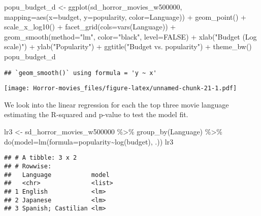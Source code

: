 \documentclass[
]{article}
\newenvironment{Shaded}{\begin{snugshade}}{\end{snugshade}}
\newcommand{\AttributeTok}[1]{\textcolor[rgb]{0.77,0.63,0.00}{#1}}
\newcommand{\ConstantTok}[1]{\textcolor[rgb]{0.00,0.00,0.00}{#1}}
\newcommand{\FunctionTok}[1]{\textcolor[rgb]{0.00,0.00,0.00}{#1}}
\newcommand{\NormalTok}[1]{#1}
\newcommand{\OtherTok}[1]{\textcolor[rgb]{0.56,0.35,0.01}{#1}}
\newcommand{\SpecialCharTok}[1]{\textcolor[rgb]{0.00,0.00,0.00}{#1}}
\newcommand{\StringTok}[1]{\textcolor[rgb]{0.31,0.60,0.02}{#1}}
\begin{document}
\begin{Shaded}
\begin{Highlighting}[]
\NormalTok{popu\_budget\_d }\OtherTok{\textless{}{-}} \FunctionTok{ggplot}\NormalTok{(sd\_horror\_movies\_w500000, }\AttributeTok{mapping=}\FunctionTok{aes}\NormalTok{(}\AttributeTok{x=}\NormalTok{budget, }\AttributeTok{y=}\NormalTok{popularity, }\AttributeTok{color=}\NormalTok{Language)) }\SpecialCharTok{+} \FunctionTok{geom\_point}\NormalTok{() }\SpecialCharTok{+} \FunctionTok{scale\_x\_log10}\NormalTok{() }\SpecialCharTok{+} \FunctionTok{facet\_grid}\NormalTok{(}\AttributeTok{cols=}\FunctionTok{vars}\NormalTok{(Language)) }\SpecialCharTok{+} \FunctionTok{geom\_smooth}\NormalTok{(}\AttributeTok{method=}\StringTok{"lm"}\NormalTok{, }\AttributeTok{color=}\StringTok{"black"}\NormalTok{, }\AttributeTok{level=}\ConstantTok{FALSE}\NormalTok{) }\SpecialCharTok{+} \FunctionTok{xlab}\NormalTok{(}\StringTok{"Budget (Log scale)"}\NormalTok{) }\SpecialCharTok{+} \FunctionTok{ylab}\NormalTok{(}\StringTok{"Popularity"}\NormalTok{) }\SpecialCharTok{+} \FunctionTok{ggtitle}\NormalTok{(}\StringTok{"Budget vs. popularity"}\NormalTok{) }\SpecialCharTok{+} \FunctionTok{theme\_bw}\NormalTok{()}
\NormalTok{popu\_budget\_d}
\end{Highlighting}
\end{Shaded}

\begin{verbatim}
## `geom_smooth()` using formula = 'y ~ x'
\end{verbatim}

\texttt{[image: Horror-movies\_files/figure-latex/unnamed-chunk-21-1.pdf]}

We look into the linear regression for each the top three movie language
estimating the R-squared and p-value to test the model fit.

\begin{Shaded}
\begin{Highlighting}[]
\NormalTok{lr3 }\OtherTok{\textless{}{-}}\NormalTok{ sd\_horror\_movies\_w500000 }\SpecialCharTok{\%\textgreater{}\%} \FunctionTok{group\_by}\NormalTok{(Language) }\SpecialCharTok{\%\textgreater{}\%} \FunctionTok{do}\NormalTok{(}\AttributeTok{model=}\FunctionTok{lm}\NormalTok{(}\AttributeTok{formula=}\NormalTok{popularity}\SpecialCharTok{\textasciitilde{}}\FunctionTok{log}\NormalTok{(budget), .))}
\NormalTok{lr3}
\end{Highlighting}
\end{Shaded}

\begin{verbatim}
## # A tibble: 3 x 2
## # Rowwise: 
##   Language           model 
##   <chr>              <list>
## 1 English            <lm>  
## 2 Japanese           <lm>  
## 3 Spanish; Castilian <lm>
\end{verbatim}
\end{document}
